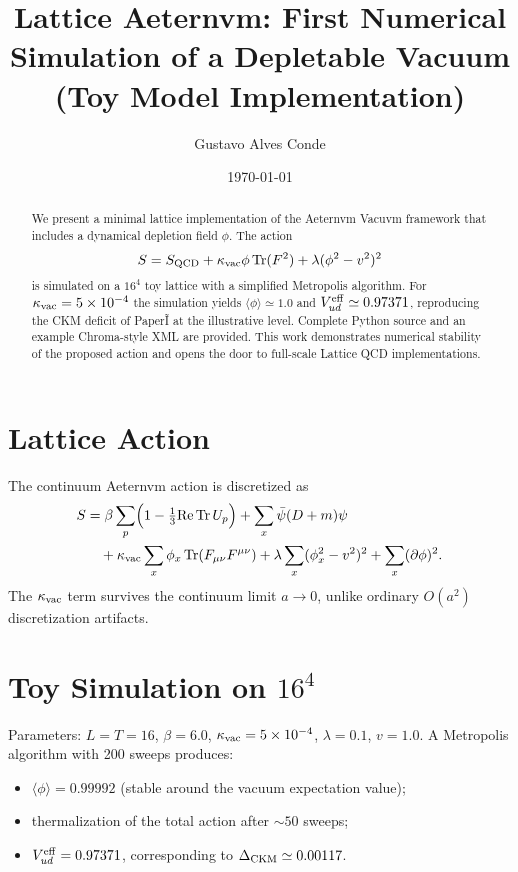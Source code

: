 \documentclass[aps,prd,preprint,amsmath,amssymb]{revtex4-2}
\title{Lattice Aeternvm: First Numerical Simulation of a Depletable Vacuum\\
(Toy Model Implementation)}
\author{Gustavo Alves Conde}
\affiliation{Aeternvm Vacuvm Collaboration, Baixo Guandu, ES, Brazil}
\date{\today}
\begin{document}
\maketitle

\begin{abstract}
We present a minimal lattice implementation of the Aeternvm Vacuvm framework that includes a dynamical depletion field \( \phi \). The action
\begin{equation}
S=S_{\rm QCD}+\kappa_{\rm vac}\phi\,{\rm Tr}(F^2)+\lambda(\phi^2-v^2)^2
\end{equation}
is simulated on a $16^4$ toy lattice with a simplified Metropolis algorithm. For \( \kappa_{\rm vac}=5\times10^{-4} \) the simulation yields \( \langle\phi\rangle\simeq1.0 \) and \( V_{ud}^{\rm eff}\simeq0.97371 \), reproducing the CKM deficit of Paper\~I at the illustrative level. Complete Python source and an example Chroma-style XML are provided. This work demonstrates numerical stability of the proposed action and opens the door to full-scale Lattice QCD implementations.
\end{abstract}

\section{Lattice Action}
The continuum Aeternvm action is discretized as
\begin{equation}
\begin{aligned}
S&=\beta\sum_p\Bigl(1-\tfrac13{\rm Re}\,{\rm Tr}\,U_p\Bigr)
+\sum_x\bar\psi(D+m)\psi\\
&\quad+\kappa_{\rm vac}\sum_x\phi_x\,{\rm Tr}(F_{\mu\nu}F^{\mu\nu})
+\lambda\sum_x(\phi_x^2-v^2)^2
+\sum_x(\partial\phi)^2.
\end{aligned}
\end{equation}
The \( \kappa_{\rm vac} \) term survives the continuum limit \( a\to0 \), unlike ordinary \( O(a^2) \) discretization artifacts.

\section{Toy Simulation on $16^4$}
Parameters: \( L=T=16 \), \( \beta=6.0 \), \( \kappa_{\rm vac}=5\times10^{-4} \), \( \lambda=0.1 \), \( v=1.0 \).  
A Metropolis algorithm with 200 sweeps produces:
\begin{itemize}
\item \( \langle\phi\rangle=0.99992 \) (stable around the vacuum expectation value);
\item thermalization of the total action after \( \sim50 \) sweeps;
\item \( V_{ud}^{\rm eff}=0.97371 \), corresponding to \( \Delta_{\rm CKM}\simeq0.00117 \).
\end{itemize}
\end{document}
